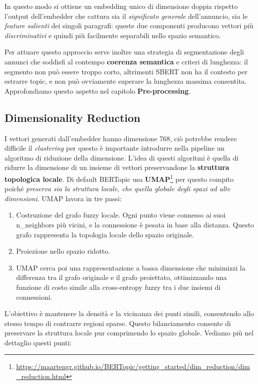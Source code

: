 In questo modo si ottiene un embedding unico di dimensione doppia rispetto l'output dell'embedder che cattura sia il \textit{significato generale} dell'annuncio, sia le \textit{feature salienti} dei singoli paragrafi: queste due componenti producono vettori più \textit{discriminativi} e quindi più facilmente separabili nello spazio semantico.

Per attuare questo approccio serve inoltre una strategia di segmentazione degli annunci che soddisfi al contempo \textbf{coerenza semantica} e criteri di lunghezza: il segmento non può essere troppo corto, altrimenti SBERT non ha il contesto per estrarre topic, e non può ovviamente superare la lunghezza massima consentita. Approfondiamo questo aspetto nel capitolo \textbf{Pre-processing}.
\subsection{Dimensionality Reduction}
I vettori generati dall'embedder hanno dimensione 768, ciò potrebbe rendere difficile il \emph{clustering} per questo è importante introdurre nella pipeline un algoritmo di riduzione della dimensione.
L'idea di questi algoritmi è quella di ridurre la dimensione di un insieme di vettori preservandone la \textbf{struttura topologica locale}.
Di default BERTopic usa \textbf{UMAP}\footnote{\url{https://maartengr.github.io/BERTopic/getting_started/dim_reduction/dim_reduction.html}} per questo compito poiché \emph{preserva sia la struttura locale, che quella globale degli spazi ad alte dimensioni}.
UMAP lavora in tre passi:
\begin{enumerate}
\item Costruzione del grafo fuzzy locale. Ogni punto viene connesso ai suoi n\_neighbors più vicini, e la connessione è pesata in base alla distanza. Questo grafo rappresenta la topologia locale dello spazio originale.
\item Proiezione nello spazio ridotto.
\item UMAP cerca poi una rappresentazione a bassa dimensione che minimizzi la differenza tra il grafo originale e il grafo proiettato, ottimizzando una funzione di costo simile alla cross-entropy fuzzy tra i due insiemi di connessioni.
\end{enumerate}

L'obiettivo è mantenere la densità e la vicinanza dei punti simili, consentendo allo stesso tempo di contrarre regioni sparse.
Questo bilanciamento consente di preservare la struttura locale pur comprimendo lo spazio globale.
Vediamo più nel dettaglio questi punti:
